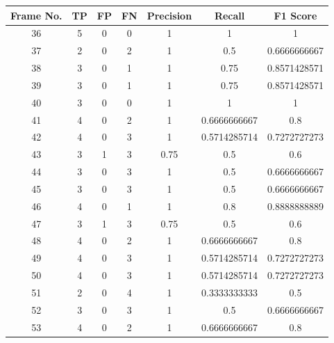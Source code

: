        \begin{table} 
                \begin{tabular}{|c|c|c|c|c|c|c|}
                \hline 
                \textbf{Frame No.} & \textbf{TP} & \textbf{FP} & \textbf{FN} & \textbf{Precision} & \textbf{Recall} & \textbf{F1 Score} \\ 
                \hline
                        36 & 5 & 0 & 0 & 1 & 1 & 1 \\ 
                \hline
                        37 & 2 & 0 & 2 & 1 & 0.5 & 0.6666666667 \\ 
                \hline
                        38 & 3 & 0 & 1 & 1 & 0.75 & 0.8571428571 \\ 
                \hline
                        39 & 3 & 0 & 1 & 1 & 0.75 & 0.8571428571 \\ 
                \hline
                        40 & 3 & 0 & 0 & 1 & 1 & 1 \\ 
                \hline
                        41 & 4 & 0 & 2 & 1 & 0.6666666667 & 0.8 \\ 
                \hline
                        42 & 4 & 0 & 3 & 1 & 0.5714285714 & 0.7272727273 \\ 
                \hline
                        43 & 3 & 1 & 3 & 0.75 & 0.5 & 0.6 \\ 
                \hline
                        44 & 3 & 0 & 3 & 1 & 0.5 & 0.6666666667 \\ 
                \hline
                        45 & 3 & 0 & 3 & 1 & 0.5 & 0.6666666667 \\ 
                \hline
                        46 & 4 & 0 & 1 & 1 & 0.8 & 0.8888888889 \\ 
                \hline
                        47 & 3 & 1 & 3 & 0.75 & 0.5 & 0.6 \\ 
                \hline
                        48 & 4 & 0 & 2 & 1 & 0.6666666667 & 0.8 \\ 
                \hline
                        49 & 4 & 0 & 3 & 1 & 0.5714285714 & 0.7272727273 \\ 
                \hline
                        50 & 4 & 0 & 3 & 1 & 0.5714285714 & 0.7272727273 \\ 
                \hline
                        51 & 2 & 0 & 4 & 1 & 0.3333333333 & 0.5 \\ 
                \hline
                        52 & 3 & 0 & 3 & 1 & 0.5 & 0.6666666667 \\ 
                \hline
                        53 & 4 & 0 & 2 & 1 & 0.6666666667 & 0.8 \\ 

\end{tabular}
\end{table}
